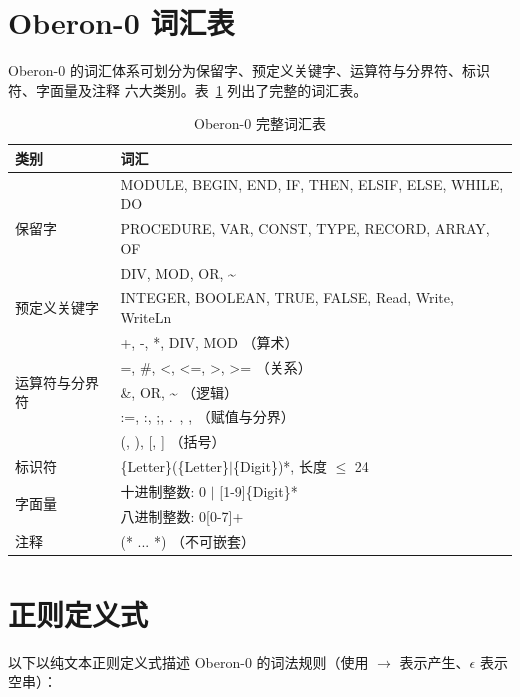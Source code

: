 \documentclass[a4paper]{article}
\begin{document}
\section{Oberon-0 词汇表}

Oberon-0 的词汇体系可划分为保留字、预定义关键字、运算符与分界符、标识符、字面量及注释
六大类别。表~\ref{tab:vocab} 列出了完整的词汇表。

\begin{table}[H]
\centering
\caption{Oberon-0 完整词汇表}
\label{tab:vocab}
\begin{tabular}{@{}ll@{}}
\toprule
\textbf{类别} & \textbf{词汇} \\
\midrule
\multirow{3}{*}{保留字}
& MODULE, BEGIN, END, IF, THEN, ELSIF, ELSE, WHILE, DO \\
& PROCEDURE, VAR, CONST, TYPE, RECORD, ARRAY, OF \\
& DIV, MOD, OR, \~{} \\
\midrule
预定义关键字 & INTEGER, BOOLEAN, TRUE, FALSE, Read, Write, WriteLn \\
\midrule
\multirow{5}{*}{运算符与分界符}
& +, -, *, DIV, MOD \quad（算术）\\
& =, \#, <, <=, >, >= \quad（关系）\\
& \&, OR, \~{} \quad（逻辑）\\
& :=, :, ;, .\ , , \quad（赋值与分界）\\
& (, ), [, ] \quad（括号）\\
\midrule
标识符 & \{Letter\}(\{Letter\}$\mid$\{Digit\})*, 长度 $\leq$ 24 \\
\midrule
\multirow{2}{*}{字面量}
& 十进制整数: 0 $\mid$ [1-9]\{Digit\}* \\
& 八进制整数: 0[0-7]+ \\
\midrule
注释 & (* ... *) \quad（不可嵌套）\\
\bottomrule
\end{tabular}
\end{table}

\section{正则定义式}

以下以纯文本正则定义式描述 Oberon-0 的词法规则（使用 $\to$ 表示产生、$\epsilon$ 表示空串）：
\end{document}
